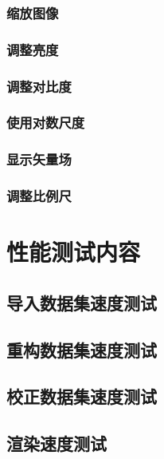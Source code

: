 \documentclass[a4paper,12pt]{report}	%
\begin{document}
\subsection{缩放图像}

\subsection{调整亮度}

\subsection{调整对比度}

\subsection{使用对数尺度}

\subsection{显示矢量场}

\subsection{调整比例尺}





\chapter{性能测试内容}

\section{导入数据集速度测试}

\section{重构数据集速度测试}

\section{校正数据集速度测试}

\section{渲染速度测试}
\end{document}

